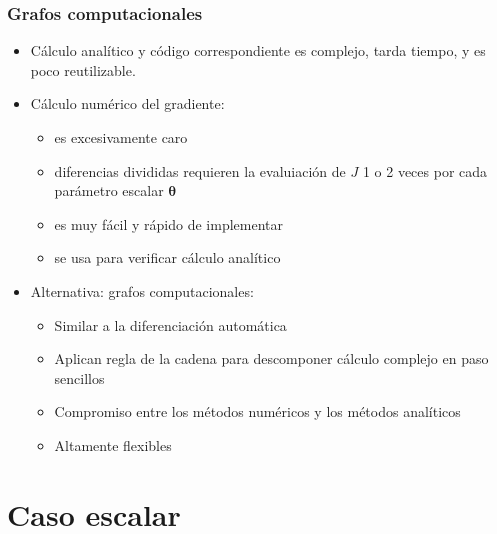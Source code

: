 \documentclass{beamer}
\begin{document}
\begin{frame}
\frametitle{Grafos computacionales}
\begin{itemize}
\item Cálculo analítico y código correspondiente es complejo, tarda tiempo, y es poco reutilizable.  
\item Cálculo numérico del gradiente:
\begin{itemize}
\item es excesivamente caro
\item diferencias divididas requieren la evaluiación de $J$ 1 o 2 veces por cada parámetro escalar $ \boldsymbol{\theta}$
\item es muy fácil y rápido de implementar
\item se usa para verificar cálculo analítico
\end{itemize}

\item Alternativa: grafos computacionales: 

\begin{itemize}
\item Similar a la diferenciación automática
\item Aplican regla de la cadena para descomponer cálculo complejo en paso sencillos 
\item Compromiso entre los métodos numéricos y los métodos analíticos
\item Altamente flexibles
\end{itemize}

\end{itemize}
\end{frame}
\section{Caso escalar}
\end{document}
